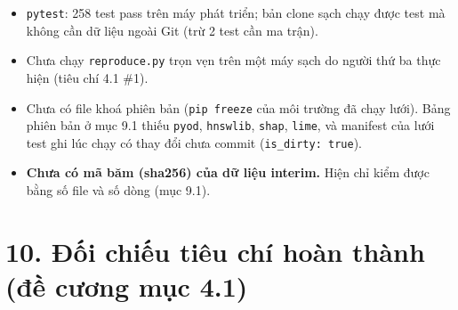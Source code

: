 \documentclass[
  11pt,
]{article}
\providecommand{\tightlist}{%
  \setlength{\itemsep}{0pt}\setlength{\parskip}{0pt}}
\begin{document}
\begin{itemize}
\tightlist
\item
  \texttt{pytest}: 258 test pass trên máy phát triển; bản clone sạch
  chạy được test mà không cần dữ liệu ngoài Git (trừ 2 test cần ma
  trận).
\item
  Chưa chạy \texttt{reproduce.\allowbreak{}py} trọn vẹn trên một máy
  sạch do người thứ ba thực hiện (tiêu chí 4.1 \#1).
\item
  Chưa có file khoá phiên bản (\texttt{pip freeze} của môi trường đã
  chạy lưới). Bảng phiên bản ở mục 9.1 thiếu \texttt{pyod},
  \texttt{hnswlib}, \texttt{shap}, \texttt{lime}, và manifest của lưới
  test ghi lúc chạy có thay đổi chưa commit
  (\texttt{is\_\allowbreak{}dirty: true}).
\item
  \textbf{Chưa có mã băm (sha256) của dữ liệu interim.} Hiện chỉ kiểm
  được bằng số file và số dòng (mục 9.1).
\end{itemize}

\hypertarget{ux111ux1ed1i-chiux1ebfu-tiuxeau-chuxed-houxe0n-thuxe0nh-ux111ux1ec1-cux1b0ux1a1ng-mux1ee5c-4.1}{%
\section{10. Đối chiếu tiêu chí hoàn thành (đề cương mục
4.1)}\label{ux111ux1ed1i-chiux1ebfu-tiuxeau-chuxed-houxe0n-thuxe0nh-ux111ux1ec1-cux1b0ux1a1ng-mux1ee5c-4.1}}
\end{document}
